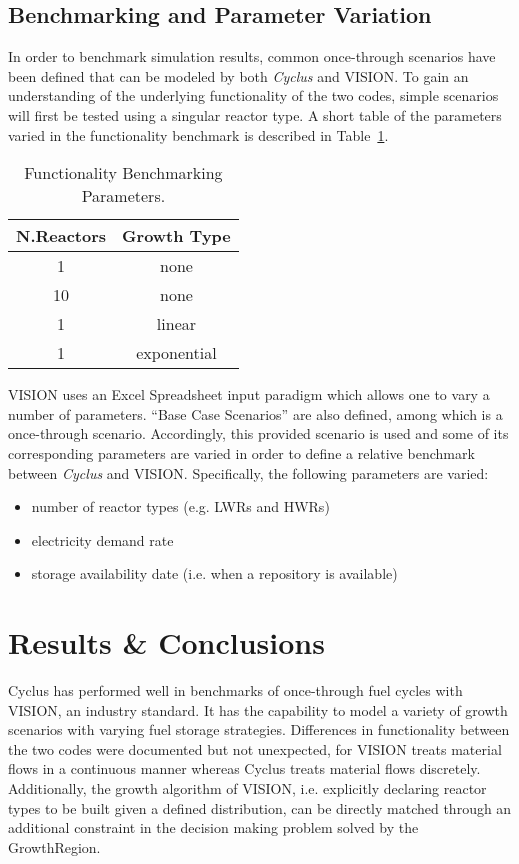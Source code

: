 \documentclass{anstrans}
\begin{document}
\subsection{Benchmarking and Parameter Variation}
In order to benchmark simulation results, common once-through
scenarios have been defined that can be modeled by both \emph{Cyclus}
and VISION. To gain an understanding of the underlying functionality
of the two codes, simple scenarios will first be tested using a
singular reactor type. A short table of the parameters varied in the
functionality benchmark is described in
Table~\ref{tab:scenarioparams}.
\begin{table} [h]
\centering
\begin{tabular} {|c|c|} 
\hline
N.Reactors & Growth Type \\
\hline
1          & none        \\
10         & none        \\
1          & linear      \\
1          & exponential \\
\hline
\end{tabular}
  \caption{Functionality Benchmarking Parameters.}
  \label{tab:scenarioparams}
\end{table}
VISION uses an Excel Spreadsheet input paradigm which allows one to
vary a number of parameters. ``Base Case Scenarios'' are also defined,
among which is a once-through scenario.  Accordingly, this provided
scenario is used and some of its corresponding parameters are varied
in order to define a relative benchmark between \emph{Cyclus} and
VISION. Specifically, the following parameters are varied:
\begin{itemize}
\item number of reactor types (e.g. LWRs and HWRs)
\item electricity demand rate
\item storage availability date (i.e. when a repository is available)
\end{itemize}
\section{Results \& Conclusions}
Cyclus has performed well in benchmarks of once-through fuel cycles
with VISION, an industry standard. It has the capability to model a
variety of growth scenarios with varying fuel storage
strategies. Differences in functionality between the two codes were
documented but not unexpected, for VISION treats material flows in a
continuous manner whereas Cyclus treats material flows
discretely. Additionally, the growth algorithm of VISION,
i.e. explicitly declaring reactor types to be built given a defined
distribution, can be directly matched through an additional constraint
in the decision making problem solved by the GrowthRegion.
\end{document}
